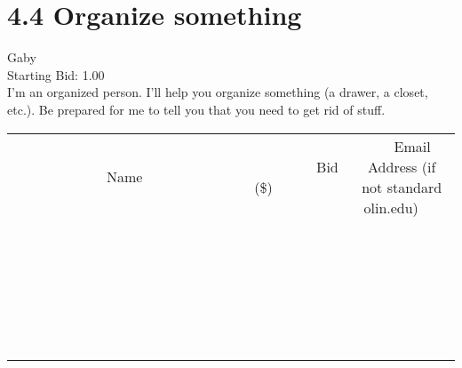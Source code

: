 \documentclass[11pt]{article}
\begin{document}
					\section*{4.4 Organize something}
					Gaby \\
					Starting Bid: 1.00 \\
					I'm an organized person. I'll help you organize something (a drawer, a closet, etc.). Be prepared for me to tell you that you need to get rid of stuff. \\
					[6ex]
					\begin{tabular}{c c c}
						~~~~~~~~~~~~~Name~~~~~~~~~~~~~ & ~~~~~~~~~Bid (\$)~~~~~~~~~ & ~~~Email Address (if not standard olin.edu)~~~ \\
				
 & & \\
\hline
 & & \\
\hline
 & & \\
\hline
 & & \\
\hline
 & & \\
\hline
 & & \\
\hline
 & & \\
\hline
 & & \\
\hline
 & & \\
\hline
 & & \\
\hline
 & & \\
\hline
 & & \\
\hline
 & & \\
\hline
 & & \\
\hline
 & & \\
\hline
 & & \\
\hline
 & & \\
\hline
 & & \\
\hline
 & & \\
\hline
 & & \\
\hline
 & & \\
\hline
 & & \\
\hline
 & & \\
\hline
 & & \\
\hline
 & & \\
\hline
 & & \\
\hline
					\end{tabular}
					\clearpage
				
\end{document}
